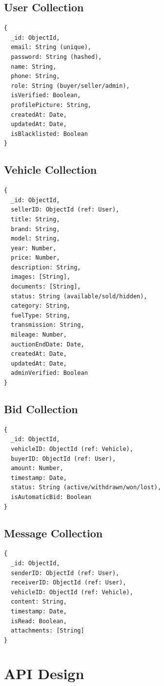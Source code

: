 \subsection{User Collection}
\begin{verbatim}
{
  _id: ObjectId,
  email: String (unique),
  password: String (hashed),
  name: String,
  phone: String,
  role: String (buyer/seller/admin),
  isVerified: Boolean,
  profilePicture: String,
  createdAt: Date,
  updatedAt: Date,
  isBlacklisted: Boolean
}
\end{verbatim}

\subsection{Vehicle Collection}
\begin{verbatim}
{
  _id: ObjectId,
  sellerID: ObjectId (ref: User),
  title: String,
  brand: String,
  model: String,
  year: Number,
  price: Number,
  description: String,
  images: [String],
  documents: [String],
  status: String (available/sold/hidden),
  category: String,
  fuelType: String,
  transmission: String,
  mileage: Number,
  auctionEndDate: Date,
  createdAt: Date,
  updatedAt: Date,
  adminVerified: Boolean
}
\end{verbatim}

\subsection{Bid Collection}
\begin{verbatim}
{
  _id: ObjectId,
  vehicleID: ObjectId (ref: Vehicle),
  buyerID: ObjectId (ref: User),
  amount: Number,
  timestamp: Date,
  status: String (active/withdrawn/won/lost),
  isAutomaticBid: Boolean
}
\end{verbatim}

\subsection{Message Collection}
\begin{verbatim}
{
  _id: ObjectId,
  senderID: ObjectId (ref: User),
  receiverID: ObjectId (ref: User),
  vehicleID: ObjectId (ref: Vehicle),
  content: String,
  timestamp: Date,
  isRead: Boolean,
  attachments: [String]
}
\end{verbatim}

\section{API Design}

